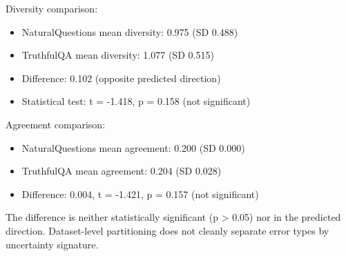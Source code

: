 Diversity comparison:
\begin{itemize}
\item NaturalQuestions mean diversity: 0.975 (SD 0.488)
\item TruthfulQA mean diversity: 1.077 (SD 0.515)
\item Difference: 0.102 (opposite predicted direction)
\item Statistical test: t = -1.418, p = 0.158 (not significant)
\end{itemize}

Agreement comparison:
\begin{itemize}
\item NaturalQuestions mean agreement: 0.200 (SD 0.000)
\item TruthfulQA mean agreement: 0.204 (SD 0.028)
\item Difference: 0.004, t = -1.421, p = 0.157 (not significant)
\end{itemize}

The difference is neither statistically significant (p > 0.05) nor in the predicted direction. Dataset-level partitioning does not cleanly separate error types by uncertainty signature.
